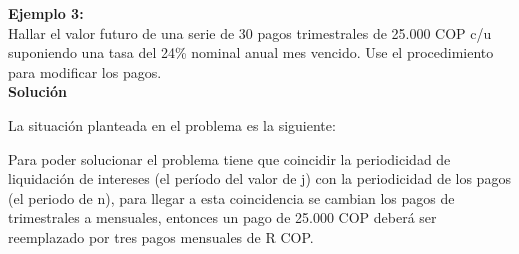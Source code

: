 \textbf{Ejemplo 3:}\\
Hallar el valor futuro de una serie de 30 pagos trimestrales de 25.000 COP c/u suponiendo una tasa del 24\% nominal anual mes vencido. Use el procedimiento para modificar los pagos.\\

\textbf{Solución}

La situación planteada en el problema es la siguiente:

Para poder  solucionar  el  problema  tiene que coincidir la periodicidad de liquidación de intereses (el período del valor de j) con la periodicidad de los pagos (el periodo de n), para llegar a esta coincidencia se cambian los pagos  de  trimestrales  a  mensuales,  entonces  un  pago  de 25.000 COP  deberá  ser reemplazado por tres pagos mensuales de R COP.

